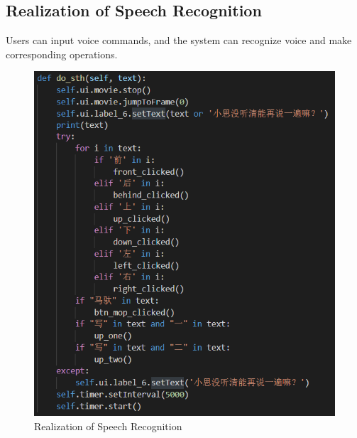 \documentclass{hci}
\begin{document}
\subsection{Realization of Speech Recognition}
Users can input voice commands, and the system can recognize voice and make corresponding operations.
\begin{figure}[htbp]
	\centering
	\includegraphics[width=0.9\linewidth]{figures/74}
	\caption{Realization of Speech Recognition}
	\label{fig:64}
\end{figure}
\end{document}
